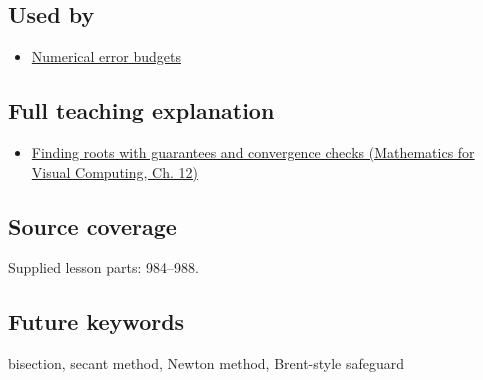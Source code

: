 \subsection{Used by}\label{appendix-f63eb850796d-used-by}

\hypertarget{appendix-f63eb850796d-used-by}{}

\begin{itemize}
\tightlist
\item
  \hyperref[appendix-31b8c295e05f]{Numerical error budgets}
\end{itemize}

\subsection{Full teaching explanation}\label{appendix-f63eb850796d-full-teaching-explanation}

\hypertarget{appendix-f63eb850796d-full-teaching-explanation}{}

\begin{itemize}
\tightlist
\item
  \href{../02-Mathematics-for-Visual-Computing/main.pdf\#nameddest=02-foundations-ii-ch028-finding-roots-with-guarantees-and-convergence-checks}{Finding roots with guarantees and convergence checks (Mathematics for Visual Computing, Ch. 12)}
\end{itemize}

\subsection{Source coverage}\label{appendix-f63eb850796d-source-coverage}

\hypertarget{appendix-f63eb850796d-source-coverage}{}

Supplied lesson parts: 984--988.

\subsection{Future keywords}\label{appendix-f63eb850796d-future-keywords}

\hypertarget{appendix-f63eb850796d-future-keywords}{}

bisection, secant method, Newton method, Brent-style safeguard
